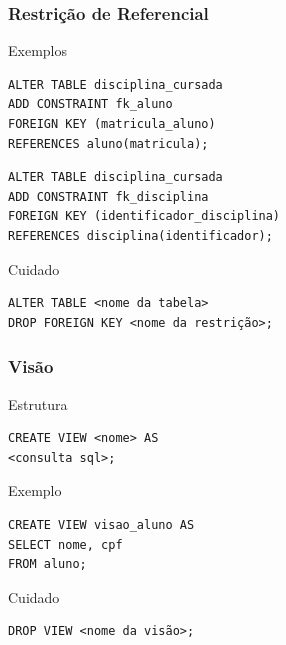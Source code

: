 \documentclass{beamer}
\begin{document}
\begin{frame}[fragile]
\frametitle{Restrição de Referencial}

\begin{exampleblock}{Exemplos}
	\begin{lstlisting}
ALTER TABLE disciplina_cursada
ADD CONSTRAINT fk_aluno
FOREIGN KEY (matricula_aluno)
REFERENCES aluno(matricula);
	\end{lstlisting}
	
	\begin{lstlisting}
ALTER TABLE disciplina_cursada
ADD CONSTRAINT fk_disciplina
FOREIGN KEY (identificador_disciplina)
REFERENCES disciplina(identificador);
	\end{lstlisting}	
\end{exampleblock}\vfill

\begin{alertblock}{Cuidado}
	\begin{lstlisting}
ALTER TABLE <nome da tabela>
DROP FOREIGN KEY <nome da restrição>;	
\end{lstlisting}
\end{alertblock}
\end{frame}

\begin{frame}[fragile]
\frametitle{Visão}

\begin{block}{Estrutura}
	\begin{lstlisting}
CREATE VIEW <nome> AS
<consulta sql>;
	\end{lstlisting}
\end{block}\vfill

\begin{exampleblock}{Exemplo}
	\begin{lstlisting}
CREATE VIEW visao_aluno AS
SELECT nome, cpf
FROM aluno;
	\end{lstlisting}
\end{exampleblock}\vfill

\begin{alertblock}{Cuidado}
	\begin{lstlisting}
DROP VIEW <nome da visão>;
	\end{lstlisting}
\end{alertblock}
\end{frame}
\end{document}
